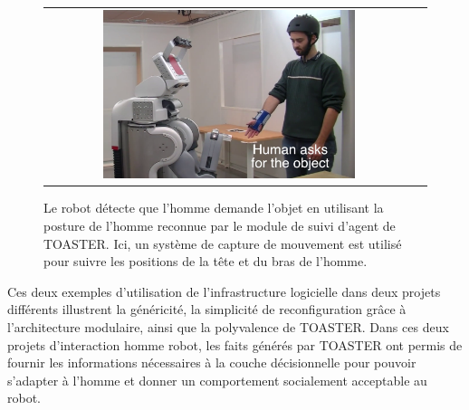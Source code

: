 \documentclass[a4paper,11pt,twoside]{StyleThese}
\begin{document}
 \begin{figure}[ht!]

 \centering
 \begin{tabular}{cc}
  \includegraphics[width=0.7\textwidth]{img/sapharishrink.png}
 \end{tabular}
 \caption{Le robot détecte que l'homme demande l'objet en utilisant la posture de l'homme reconnue par le module de suivi d'agent de TOASTER. Ici, un système de capture de mouvement est utilisé pour suivre les positions de la tête et du bras de l'homme.}
 \label{fig:saphari}
  \vspace{-15pt}
 \end{figure}
 
 
 Ces deux exemples d'utilisation de l'infrastructure logicielle dans deux projets différents illustrent la généricité, la simplicité de reconfiguration grâce à l'architecture modulaire, ainsi que la polyvalence de TOASTER. Dans ces deux projets d'interaction homme robot, les faits générés par TOASTER ont permis de fournir les informations nécessaires à la couche décisionnelle pour pouvoir s'adapter à l'homme et donner un comportement socialement acceptable au robot.

% 



\ifdefined{}
\else


\end{document}
